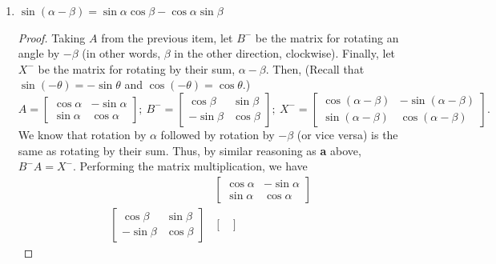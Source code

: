 \documentclass{article}
\begin{document}
\begin{enumerate}
\begin{enumerate}
\begin{proof}
\[\begin{bmatrix}
                    \cos(\alpha + \beta)&-\sin(\alpha + \beta) \\ \colorbox{Periwinkle!42}{\(\sin(\alpha+\beta)\)}&\cos(\alpha + \beta)
                \end{bmatrix} 
            \] gives us \(\sin(\alpha + \beta) = \sin\alpha\cos\beta + \cos\alpha\sin\beta\), which proves the identity. 
        \end{proof}
        \item \(\sin(\alpha - \beta) = \sin\alpha\cos\beta - \cos\alpha\sin\beta\)\begin{proof}
            Taking \(A\) from the previous item, let \(B^-\) be the matrix for rotating an angle by \(-\beta\) (in other words, \(\beta\) in the other direction, clockwise). Finally, let \(X^-\) be the matrix for rotating by their sum, \(\alpha -\beta\). Then, 
            (Recall that \(\sin(-\theta) = -\sin\theta\) and \(\cos(-\theta) = \cos\theta\).)\[
                A = \begin{bmatrix}
                    \cos\alpha&-\sin\alpha \\ \sin\alpha&\cos\alpha
                \end{bmatrix};~B^- = \begin{bmatrix}
                    \cos\beta&\sin\beta \\ -\sin\beta&\cos\beta
                \end{bmatrix};~X^- =  \begin{bmatrix}
                    \cos(\alpha - \beta)&-\sin(\alpha - \beta) \\ \sin(\alpha-\beta)&\cos(\alpha - \beta)
                \end{bmatrix}.
            \] We know that rotation by \(\alpha\) followed by rotation by \(-\beta\) (or vice versa) is the same as rotating by their sum. Thus, by similar reasoning as \textbf{a} above, \(B^-A = X^-\). Performing the matrix multiplication, we have\begin{align*} 
                &\begin{bmatrix}
                    \cos\alpha&-\sin\alpha \\ \sin\alpha&\cos\alpha
                \end{bmatrix} \\
                \begin{bmatrix}
                    \cos\beta&\sin\beta \\ -\sin\beta&\cos\beta
                \end{bmatrix} & \begin{bmatrix}

\end{bmatrix}
\end{align*}
\end{proof}
\end{enumerate}
\end{enumerate}
\end{document}
